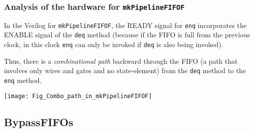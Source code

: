 \begin{frame}[fragile]
\frametitle{Analysis of the hardware for {\tt mkPipelineFIFOF}}

\footnotesize

In the Verilog for \verb|mkPipelineFIFOF|, the READY signal
for \verb|enq| incorporates the ENABLE signal of the \verb|deq| method
(because if the FIFO is full from the previous clock, in this
clock \verb|enq| can only be invoked if \verb|deq| is also being
invoked).

\vspace{2ex}

Thus, there is a \emph{combinational path} backward through the FIFO
(a path that involves only wires and gates and no state-element) from
the \verb|deq| method to the \verb|enq| method.

\vspace{2ex}

\begin{center}
  \texttt{[image: Fig\_Combo\_path\_in\_mkPipelineFIFOF]}
\end{center}

\end{frame}


\subsection{BypassFIFOs}

